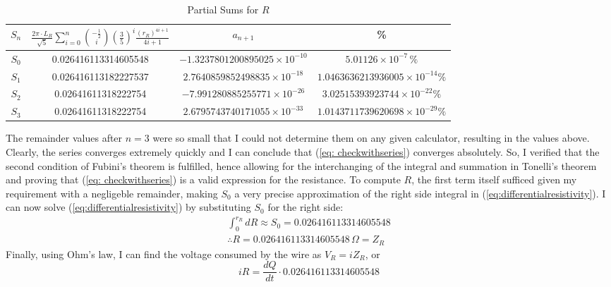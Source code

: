 \documentclass[12pt]{article}
\numberwithin{equation}{section}
\begin{document}
\begin{table}[h!]
  \begin{center}
  \begin{tabular}{|  c  |c  |c   |c|} \hline    $S_n$ & $\frac{2\pi \cdot L_R}{ \sqrt{5}} \sum_{i=0}^{n} \binom{-\frac{1}{2}}{i} 
\left(\frac{3}{5}\right)^i \frac{(r_R) ^{4i+1}}{4i+1} $ & $a_{n+1}$ & \% \\ \hline   
    $S_0$ & 0.026416113314605548 & $  -1.3237801200895025 \times 10 
^{-10} $ & $  5.01126 \times 10 
^{-7} \, \% $ \\ \hline   
    $S_1$ & 0.026416113182227537 & $ 2.7640859852498835 \times 10^{-18} $ &  $ 1.0463636213936005 \times 10^{-14} \%$ \\ \hline   
    $S_2$ & 0.02641611318222754 & $ -7.991280885255771 \times 10^{-26}$& $ 3.02515393923744 \times 10^{-22} \% $ \\ \hline   
    $S_3$ & 0.02641611318222754 &$ 2.6795743740171055 \times 10^{-33}$ & $ 1.0143711739620698 \times 10^{-29} \%$ \\ \hline 
\end{tabular} 
\end{center}
    \caption{Partial Sums for $R$}
    \label{tab:partialsums}
\end{table}

\noindent The remainder values after $n=3$ were so small that I could not determine them on any given calculator, resulting in the values above. Clearly, the series converges extremely quickly and I can conclude that (\ref{eq: checkwithseries}) converges absolutely. So, I verified that the second condition of Fubini's theorem is fulfilled, hence allowing for the interchanging of the integral and summation in Tonelli's theorem and proving that (\ref{eq: checkwithseries}) is a valid expression for the resistance. To compute $R$, the first term itself sufficed given my requirement with a negligeble remainder, making $S_0$ a very precise approximation of the right side integral in (\ref{eq:differentialresistivity}). I can now solve (\ref{eq:differentialresistivity}) by substituting $S_0$ for the right side:
\begin{gather*}
    \int_{0}^{r_R}{dR} \approx S_0 = 0.026416113314605548\\
    \therefore R = 0.026416113314605548 \, \Omega = Z_R
\end{gather*}
Finally, using Ohm's law, I can find the voltage consumed by the wire as $V_{R}=iZ_R$, or
\begin{equation}\label{eq:wirevoltage}
    iR = \frac{dQ}{dt} \cdot 0.026416113314605548
\end{equation}
\end{document}
